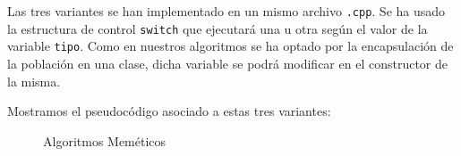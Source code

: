 Las tres variantes se han implementado en un mismo archivo \texttt{.cpp}. Se ha usado la estructura de control \texttt{switch} que ejecutará una u otra según el valor de la variable \texttt{tipo}. Como en nuestros algoritmos se ha optado por la encapsulación de la población en una clase, dicha variable se podrá modificar en el constructor de la misma. 

\newpage 
Mostramos el pseudocódigo asociado a estas tres variantes:
\begin{figure}[H]
	\centering
	\begin{minipage}{.9\linewidth}
		
		
		
		\begin{algorithm}[H] 
			
			\caption{Algoritmos Meméticos}
			\SetAlgoLined
			
			
\end{algorithm}
\end{minipage}
\end{figure}
